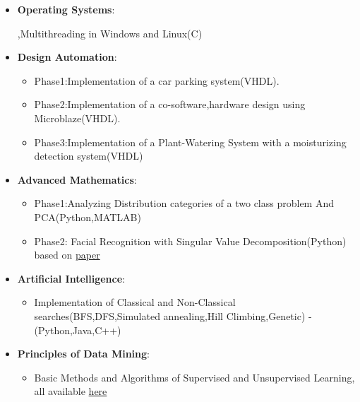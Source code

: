 \documentclass[letterpaper,MMMyyyy,nonstopmode]{simpleresumecv}
\begin{document}
\begin{Body}
\begin{itemize}
     \item \textbf{Operating Systems}:
     \begin{itemize}
       \itemMultiprocessing,Multithreading in Windows and Linux(C)
		\end{itemize}
	

	
	\item \textbf{Design Automation}:
		\begin{itemize}
		\item Phase1:Implementation of a car parking system(VHDL).
     	\item Phase2:Implementation of a co-software,hardware design using
     	      Microblaze(VHDL).
	    \item Phase3:Implementation of a Plant-Watering System with a moisturizing
	          detection system(VHDL)
	          
		\end{itemize}
		
	
		
    \item \textbf{Advanced Mathematics}: 
	    \begin{itemize}
        \item Phase1:Analyzing Distribution categories of a two class  problem And PCA(Python,MATLAB)
		      \item Phase2:
     	     Facial Recognition with Singular Value Decomposition(Python)
     	     based on 	\href{https://link.springer.com/chapter/10.1007/978-1-4020-6264-3_26}{paper}
     \end{itemize}
      
   
       	  \item \textbf{Artificial Intelligence}: 
	    \begin{itemize}
        \item 
		  Implementation of Classical and Non-Classical searches(BFS,DFS,Simulated annealing,Hill Climbing,Genetic) - (Python,Java,C++)
     \end{itemize}
     
     
       	  \item \textbf{Principles of Data Mining}: 
	    \begin{itemize}
        \item 
	Basic Methods and Algorithms of Supervised and Unsupervised Learning, all available \href{https://github.com/Yasaman1997/DataMining_and_DataAnalysis/tree/master/DM_2018/HWS}{here}
     \end{itemize}
     

\end{itemize}
\end{Body}
\end{document}
